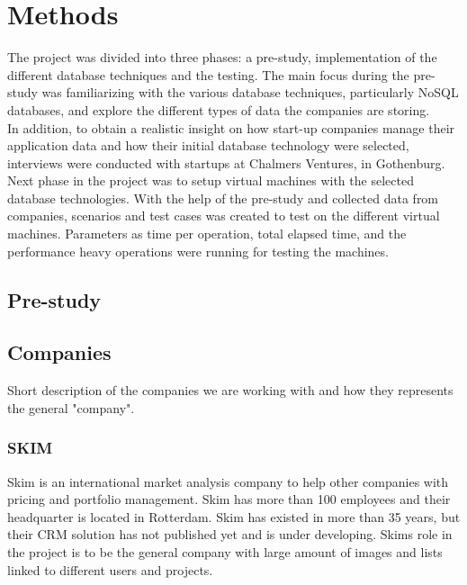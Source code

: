 \chapter{Methods}
The project was divided into three phases: a pre-study, implementation of the different database techniques and the testing. The main focus during the pre-study was familiarizing with the various database techniques, particularly NoSQL databases, and explore the different types of data the companies are storing.\\
In addition, to obtain a realistic insight on how start-up companies manage their application data and how their initial database technology were selected, interviews were conducted with startups at Chalmers Ventures, in Gothenburg. 
\\[0.5cm]
Next phase in the project was to setup virtual machines with the selected database technologies. With the help of the pre-study and collected data from companies, scenarios and test cases was created to test on the different virtual machines. Parameters as time per operation, total elapsed time, and the performance heavy operations were running for testing the machines.  
\\[0.5cm]

\section{Pre-study}

\section{Companies}

Short description of the companies we are working with and how they represents the general "company".
\subsection{SKIM}
Skim is an international market analysis company to help other companies with pricing and portfolio management. Skim has more than 100 employees and their headquarter is located in Rotterdam.
Skim has existed in more than 35 years, but their CRM solution has not published yet and is under developing.
Skims role in the project is to be the general company with large amount of images and lists linked to different users and projects. %

